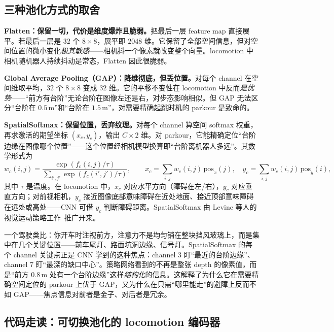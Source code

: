 \subsection{三种池化方式的取舍}
\label{sec:rlmc-vm-pooling}

\textbf{Flatten：保留一切，代价是维度爆炸且脆弱。}把最后一层 feature map 直接展平。若最后一层是 $32$ 个 $8\times8$，展平即 $2048$ 维。它保留了全部空间信息，但对空间位置的微小变化\emph{极其敏感}——相机抖一个像素就改变整个向量。locomotion 中相机随机器人持续抖动是常态，Flatten 因此很脆弱。

\textbf{Global Average Pooling（GAP）：降维彻底，但丢位置。}对每个 channel 在空间维取平均，$32$ 个 $8\times8$ 变成 $32$ 维。它的平移不变性在 locomotion 中反而\emph{是优势}——“前方有台阶”无论台阶在图像左还是右，对步态影响相似。但 GAP 无法区分“台阶在 $0.5$\,m”和“台阶在 $1.5$\,m”，对需要精确起跳时机的 parkour 是致命的。

\textbf{SpatialSoftmax：保留位置，丢弃纹理。}对每个 channel 算空间 softmax 权重，再求激活的期望坐标 $(x_c, y_c)$，输出 $C\times2$ 维。对 parkour，它能精确定位“台阶边缘在图像哪个位置”——这个位置经相机模型换算即“台阶离机器人多远”。其数学形式为
\begin{equation}
w_c(i,j) = \frac{\exp(f_c(i,j)/\tau)}{\sum_{i',j'}\exp(f_c(i',j')/\tau)},\qquad
x_c = \sum_{i,j} w_c(i,j)\,\text{pos}_x(j),\quad
y_c = \sum_{i,j} w_c(i,j)\,\text{pos}_y(i),
\label{eq:rlmc-vm-ssm}
\end{equation}
其中 $\tau$ 是温度。在 locomotion 中，$x_c$ 对应水平方向（障碍在左/右），$y_c$ 对应垂直方向；对前视相机，$y_c$ 接近图像底部意味障碍在近处地面、接近顶部意味障碍在远处或高处——CNN 可借 $y_c$ 判断障碍距离。SpatialSoftmax 由 Levine 等人的视觉运动策略工作\,\cite{levine2016visuomotor} 推广开来。

\begin{insight}\label{ins:rlmc-vm-ssm-focus}
一个驾驶类比：你开车时注视前方，注意力不是均匀铺在整块挡风玻璃上，而是集中在几个关键位置——前车尾灯、路面坑洞边缘、信号灯。SpatialSoftmax 的每个 channel 关键点正是 CNN 学到的这种焦点：channel 3 盯“最近的台阶边缘”、channel 7 盯“最深的缺口中心”。策略网络看到的不再是整张 depth 的像素值，而是“前方 $0.8$\,m 处有一个台阶边缘”这样\emph{结构化}的信息。这解释了为什么它在需要精确空间定位的 parkour 上优于 GAP，又为什么在只需“哪里能走”的避障上反而不如 GAP——焦点信息对前者是金子、对后者是冗余。
\end{insight}

\subsection{代码走读：可切换池化的 locomotion 编码器}
\label{sec:rlmc-vm-encoder-code}

